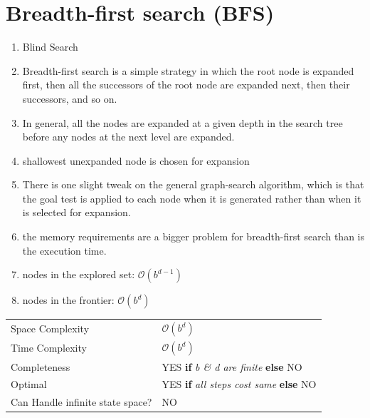 \section{Breadth-first search (BFS) \cite{aci-1}}\label{Breadth-first search BFS}

\begin{enumerate}
    \item Blind Search
    
    \item Breadth-first search is a simple strategy in which the root node is expanded first, then all the successors of the root node are expanded next, then their successors, and so on. 
    
    \item In general, all the nodes are expanded at a given depth in the search tree before any nodes at the next level are expanded.

    \item shallowest unexpanded node is chosen for expansion

    \item There is one slight tweak on the general graph-search algorithm, which is that the goal test is applied to each node when it is generated rather than when it is selected for expansion.

    \item  the memory requirements are a bigger problem for breadth-first search than is the execution time.

    \item nodes in the explored set: $\mathcal{O}(b^{d-1})$

    \item nodes in the frontier: $\mathcal{O}(b^{d})$
\end{enumerate}


\begin{customTableWrapper}{1.2}
\begin{longtable}{p{4cm} p{8cm}}
    Space Complexity & $\mathcal{O}(b^d)$ \\

    Time Complexity & $\mathcal{O}(b^d)$ \\

    \hline
    
    Completeness & YES \textbf{if} \textit{b \& d are finite} \textbf{else} NO\\

    Optimal & YES \textbf{if} \textit{all steps cost same} \textbf{else} NO \\

    Can Handle infinite state space? & NO \\
\end{longtable}
\end{customTableWrapper}


